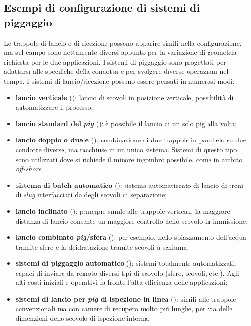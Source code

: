 \subsection{Esempi di configurazione di sistemi di piggaggio}
Le trappole di lancio e di ricezione possono apparire simili nella configurazione, ma sul campo sono nettamente diversi appunto per la variazione di geometria richiesta per le due applicazioni. I sistemi di piggaggio sono progettati per adattarsi alle specifiche della condotta e per svolgere diverse operazioni nel tempo. I sistemi di lancio/ricezione possono essere pensati in numerosi modi:
\begin{itemize}
\item \textbf{lancio verticale} (): lancio di scovoli in posizione verticale, possibilità di automatizzare il processo;
\item \textbf{lancio standard del \textit{pig}} (): è possibile il lancio di un solo pig alla volta;
\item \textbf{lancio doppio o duale} (): combinazione di due trappole in parallelo su due condotte diverse, ma racchiuse in un unico sistema. Sistemi di questo tipo sono utilizzati dove si richiede il minore ingombro possibile, come in ambito \textit{off-shore};
\item \textbf{sistema di batch automatico} (): sistema automatizzato di lancio di treni di \textit{slug} interfacciati da degli scovoli di separazione;
\item \textbf{lancio inclinato} (): principio simile alle trappole verticali, la maggiore distanza di lancio consente un maggiore controllo dello scovolo in immissione;
\item \textbf{lancio combinato \textit{pig}/sfera} (): per esempio, nello spiazzamento dell'acqua tramite sfere e la deidratazione tramite scovoli a schiuma;
\item \textbf{sistemi di piggaggio automatico} (): sistemi totalmente automatizzati, capaci di inviare da remoto diversi tipi di scovolo (sfere, scovoli, etc.). Agli alti costi iniziali e operativi fa fronte l'alta efficienza delle applicazioni;
\item \textbf{sistemi di lancio per \textit{pig} di ispezione in linea} (): simili alle trappole convenzionali ma con camere di recupero molto più lunghe, per via delle dimenzioni dello scovolo di ispezione interna.
\end{itemize}

